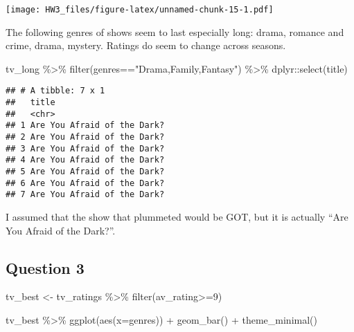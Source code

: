\documentclass[
]{article}
\newenvironment{Shaded}{\begin{snugshade}}{\end{snugshade}}
\newcommand{\AttributeTok}[1]{\textcolor[rgb]{0.77,0.63,0.00}{#1}}
\newcommand{\DecValTok}[1]{\textcolor[rgb]{0.00,0.00,0.81}{#1}}
\newcommand{\FunctionTok}[1]{\textcolor[rgb]{0.00,0.00,0.00}{#1}}
\newcommand{\NormalTok}[1]{#1}
\newcommand{\OtherTok}[1]{\textcolor[rgb]{0.56,0.35,0.01}{#1}}
\newcommand{\SpecialCharTok}[1]{\textcolor[rgb]{0.00,0.00,0.00}{#1}}
\newcommand{\StringTok}[1]{\textcolor[rgb]{0.31,0.60,0.02}{#1}}
\begin{document}
\texttt{[image: HW3\_files/figure-latex/unnamed-chunk-15-1.pdf]}

The following genres of shows seem to last especially long: drama,
romance and crime, drama, mystery. Ratings do seem to change across
seasons.

\begin{Shaded}
\begin{Highlighting}[]
\NormalTok{tv\_long }\SpecialCharTok{\%\textgreater{}\%} 
  \FunctionTok{filter}\NormalTok{(genres}\SpecialCharTok{==}\StringTok{"Drama,Family,Fantasy"}\NormalTok{) }\SpecialCharTok{\%\textgreater{}\%} 
\NormalTok{  dplyr}\SpecialCharTok{::}\FunctionTok{select}\NormalTok{(title)}
\end{Highlighting}
\end{Shaded}

\begin{verbatim}
## # A tibble: 7 x 1
##   title                      
##   <chr>                      
## 1 Are You Afraid of the Dark?
## 2 Are You Afraid of the Dark?
## 3 Are You Afraid of the Dark?
## 4 Are You Afraid of the Dark?
## 5 Are You Afraid of the Dark?
## 6 Are You Afraid of the Dark?
## 7 Are You Afraid of the Dark?
\end{verbatim}

I assumed that the show that plummeted would be GOT, but it is actually
``Are You Afraid of the Dark?''.

\hypertarget{question-3-1}{%
\subsection{Question 3}\label{question-3-1}}

\begin{Shaded}
\begin{Highlighting}[]
\NormalTok{tv\_best }\OtherTok{\textless{}{-}}\NormalTok{ tv\_ratings }\SpecialCharTok{\%\textgreater{}\%} 
  \FunctionTok{filter}\NormalTok{(av\_rating}\SpecialCharTok{\textgreater{}=}\DecValTok{9}\NormalTok{)}
\end{Highlighting}
\end{Shaded}

\begin{Shaded}
\begin{Highlighting}[]
\NormalTok{tv\_best }\SpecialCharTok{\%\textgreater{}\%} 
  \FunctionTok{ggplot}\NormalTok{(}\FunctionTok{aes}\NormalTok{(}\AttributeTok{x=}\NormalTok{genres)) }\SpecialCharTok{+}
  \FunctionTok{geom\_bar}\NormalTok{() }\SpecialCharTok{+} \FunctionTok{theme\_minimal}\NormalTok{()}
\end{Highlighting}
\end{Shaded}
\end{document}
